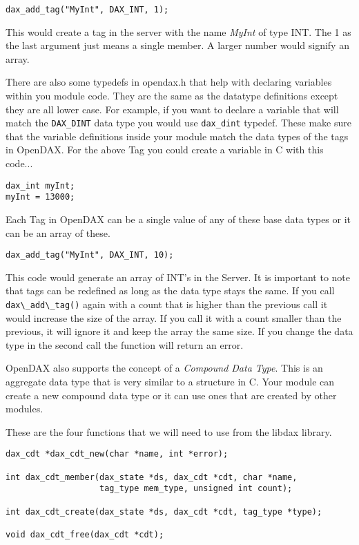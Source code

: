 \begin{verbatim}
dax_add_tag("MyInt", DAX_INT, 1);
\end{verbatim}

This would create a tag in the server with the name \textit{MyInt} of type INT.  The 1 as the last argument just means a single member.  A larger number would signify an array.

There are also some typedefs in opendax.h that help with declaring variables within you module code.  They are the same as the datatype definitions except they are all lower case.  For example, if you want to declare a variable that will match the \verb|DAX_DINT| data type you would use \verb|dax_dint| typedef.  These make sure that the variable definitions inside your module match the data types of the tags in OpenDAX.  For the above Tag you could create a variable in C with this code...

\begin{verbatim}
dax_int myInt;
myInt = 13000;
\end{verbatim}

Each Tag in OpenDAX can be a single value of any of these base data types or it can be an array of these.

\begin{verbatim}
dax_add_tag("MyInt", DAX_INT, 10);
\end{verbatim}

This code would generate an array of INT's in the Server.  It is important to note that tags can be redefined as long as the data type stays the same.  If you call \verb|dax\_add\_tag()| again with a count that is higher than the previous call it would increase the size of the array.  If you call it with a count smaller than the previous, it will ignore it and keep the array the same size.  If you change the data type in the second call the function will return an error.

OpenDAX also supports the concept of a \textit{Compound Data Type}.  This is an aggregate data type that is very similar to a structure in C.  Your module can create a new compound data type or it can use ones that are created by other modules.

These are the four functions that we will need to use from the libdax library.

\begin{verbatim}
dax_cdt *dax_cdt_new(char *name, int *error);

int dax_cdt_member(dax_state *ds, dax_cdt *cdt, char *name,
                   tag_type mem_type, unsigned int count);

int dax_cdt_create(dax_state *ds, dax_cdt *cdt, tag_type *type);

void dax_cdt_free(dax_cdt *cdt);
\end{verbatim}

